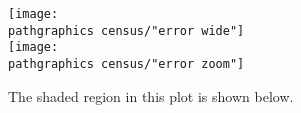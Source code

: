\begin{figure}[t]
	\texttt{[image: \\pathgraphics census/"error wide"]} \\[20pt]
	\texttt{[image: \\pathgraphics census/"error zoom"]}
	\caption{The shaded region in this plot is shown below.}
\end{figure}

\endinput  %

